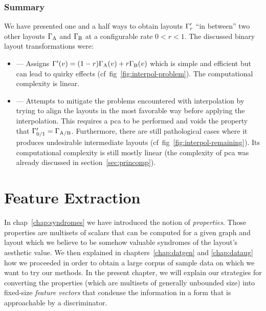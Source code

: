 \documentclass{graphstudy}
\begin{document}
\begin{Figure}
  \caption[ interpolation between a proper and a garbage layout]{%
     interpolation between a proper () and a garbage () layout shown at
    differents steps.
  }
  \label{fig:xlinear-pg}
\end{Figure}

\subsection{Summary}

We have presented one and a half ways to obtain layouts \(\Gamma_r'\) \enquote{in between} two other layouts
\(\Gamma_\mathrm{A}\) and \(\Gamma_\mathrm{B}\) at a configurable rate \(0<r<1\).  The discussed binary layout
transformations were:

\begin{itemize}
\item{} --- Assigns \(\Gamma'(v)=(1-r)\Gamma_\mathrm{A}(v)+r\Gamma_\mathrm{B}(v)\) which is simple and
  efficient but can lead to quirky effects (\acs{cf}~\acs{fig}~\ref{fig:interpol-problem}).  The computational
  complexity is linear.
\item{} --- Attempts to mitigate the problems encountered with  interpolation by trying to
  align the layouts in the most favorable way before applying the interpolation.  This requires a \ac{pca} to be
  performed and voids the property that \(\Gamma_{0/1}'=\Gamma_\mathrm{A/B}\).  Furthermore, there are still
  pathological cases where it produces undesirable intermediate layouts
  (\acs{cf}~\acs{fig}~\ref{fig:interpol-remaining}).  Its computational complexity is still mostly linear (the
  complexity of \ac{pca} was already discussed in \acs{section}~\ref{sec:princomp}).
\end{itemize}

\chapter{Feature Extraction}
\label{chap:featex}

In \acl{chap}~\ref{chap:syndromes} we have introduced the notion of \emph{properties}.  Those properties are multisets
of scalars that can be computed for a given graph and layout which we believe to be somehow valuable syndromes of the
layout's aesthetic value.  We then explained in chapters~\ref{chap:datgen} and \ref{chap:dataug} how we proceeded in
order to obtain a large corpus of sample data on which we want to try our methods.  In the present chapter, we will
explain our strategies for converting the properties (which are multisets of generally unbounded size) into fixed-size
\emph{feature vectors} that condense the information in a form that is approachable by a discriminator.
\end{document}

